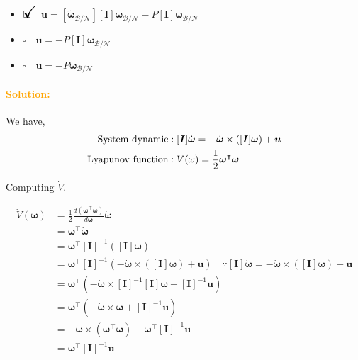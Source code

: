 \documentclass[12pt, a4paper]{article}
\newcommand{\ans}{\item[]$\rlap{\LARGE{\checkmark}}\square\quad$}
\newcommand{\noans}{\item[]$\square\quad$}
\begin{document}
\begin{itemize}
\ans $\bm{u} = [\tilde{\bm{\omega}}_{\mathcal{B}/\mathcal{N}}][\bm{I}]\bm{\omega}_{\mathcal{B}/\mathcal{N}} - P[\bm{I}]\bm{\omega}_{\mathcal{B}/\mathcal{N}}$
\noans $\bm{u} = - P[\bm{I}]\bm{\omega}_{\mathcal{B}/\mathcal{N}}$
\noans $\bm{u} = - P\bm{\omega}_{\mathcal{B}/\mathcal{N}}$
\end{itemize}

\paragraph{\textcolor{orange}{Solution:}}
We have,
\begin{equation*}
    \begin{split}
        \textnormal{System dynamic}&:[\bm{I}]\dot{\bm{\omega}}=-\dot{\bm{\omega}}\times([\bm{I}]\bm{\omega})+\bm{u}\\
        \textnormal{Lyapunov function}&:V(\omega)=\frac{1}{2}\bm{\omega}^{\intercal}\bm{\omega}\\
    \end{split}
\end{equation*}

Computing $\dot{V}$.

\begin{equation*}
    \begin{split}
        \dot{V}(\bm{\omega})&=\frac{1}{2}\frac{d(\bm{\omega}^{\intercal}\bm{\omega})}{d\bm{\omega}}\dot{\bm{\omega}}\\
        &=\bm{\omega}^{\intercal}\dot{\bm{\omega}}\\
        &=\bm{\omega}^{\intercal}[\bm{I}]^{-1}([\bm{I}]\dot{\bm{\omega}})\\
        &=\bm{\omega}^{\intercal}[\bm{I}]^{-1}(-\dot{\bm{\omega}}\times([\bm{I}]\bm{\omega})+\bm{u})\quad\because[\bm{I}]\dot{\bm{\omega}}=-\dot{\bm{\omega}}\times([\bm{I}]\bm{\omega})+\bm{u}\\
        &=\bm{\omega}^{\intercal}(-\dot{\bm{\omega}}\times[\bm{I}]^{-1}[\bm{I}]\bm{\omega}+[\bm{I}]^{-1}\bm{u})\\
        &=\bm{\omega}^{\intercal}(-\dot{\bm{\omega}}\times\bm{\omega}+[\bm{I}]^{-1}\bm{u})\\
        &=-\dot{\bm{\omega}}\times(\bm{\omega}^{\intercal}\bm{\omega})+\bm{\omega}^{\intercal}[\bm{I}]^{-1}\bm{u}\\
        &=\bm{\omega}^{\intercal}[\bm{I}]^{-1}\bm{u}\\
    \end{split}
\end{equation*}
\end{document}
